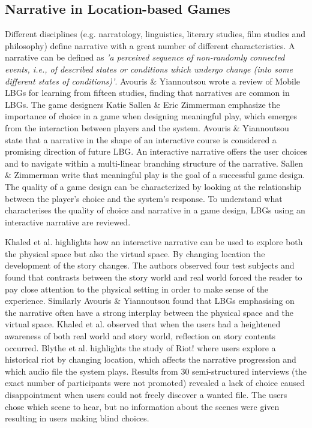 \subsection{Narrative in Location-based Games}
Different disciplines (e.g. narratology, linguistics, literary studies, film studies and philosophy) define narrative with a great number of different characteristics\cite{Grimaldi}. A narrative can be defined as \emph{'a perceived sequence of non-randomly connected events, i.e., of described states or conditions which undergo change (into some different states of conditions)'}\cite{narrativeDef}. Avouris \& Yiannoutsou wrote a review of Mobile LBGs for learning from fifteen studies, finding that narratives are common in LBGs\cite{LBG_Review}. The game designers Katie Sallen \& Eric Zimmerman emphasize the importance of choice in a game when designing meaningful play, which emerges from the interaction between players and the system\cite{RulesofPlay}. Avouris \& Yiannoutsou state that a narrative in the shape of an interactive course is considered a promising direction of future LBG\cite{LBG_Review}. An interactive narrative offers the user choices and to navigate within a multi-linear branching structure of the narrative\cite{ryanavatars}. Sallen \& Zimmerman write that meaningful play is the goal of a successful game design. The quality of a game design can be characterized by looking at the relationship between the player’s choice and the system’s response\cite{RulesofPlay}. To understand what characterises the quality of choice and narrative in a game design, LBGs using an interactive narrative are reviewed.
 
Khaled et al. highlights how an interactive narrative can be used to explore both the physical space but also the virtual space. By changing location the development of the story changes. The authors observed four test subjects and found that contrasts between the story world and real world forced the reader to pay close attention to the physical setting in order to make sense of the experience\cite{StoryTrek}. Similarly Avouris \& Yiannoutsou found that LBGs emphasising on the narrative often have a strong interplay between the physical space and the virtual space\cite{LBG_Review}. Khaled et al. observed that when the users had a heightened awareness of both real world and story world, reflection on story contents occurred\cite{StoryTrek}. Blythe et al. highlights the study of Riot! where users explore a historical riot by changing location, which affects the narrative progression and which audio file the system plays. Results from 30 semi-structured interviews (the exact number of participants were not promoted) revealed a lack of choice caused disappointment when users could not freely discover a wanted file. The users chose which scene to hear, but no information about the scenes were given resulting in users making blind choices\cite{InterdisciplinaryCriticism}.